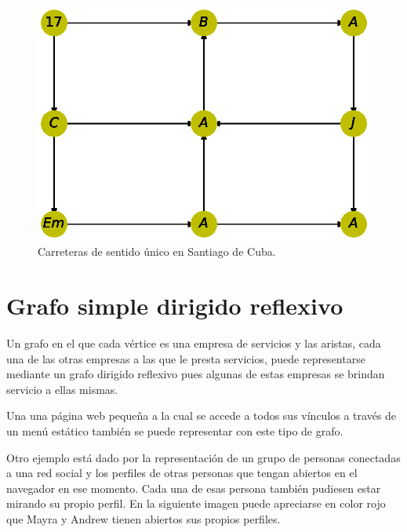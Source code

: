 \documentclass{article}
\begin{document}

\begin{figure}
  \includegraphics[width=.8\columnwidth]{5.eps}
  \caption{Carreteras de sentido único en Santiago de Cuba.}
  \label{fig:5}
\end{figure}


\section{Grafo simple dirigido reflexivo}

Un grafo en el que cada vértice es una empresa de servicios y las aristas, cada una de las otras empresas a las que le presta servicios, puede representarse mediante un grafo dirigido reflexivo pues algunas de estas empresas se brindan servicio a ellas mismas. 

Una una página web pequeña a la cual se accede a todos sus vínculos a través de un menú estático también se puede representar con este tipo de grafo. 

Otro ejemplo está dado por la representación de un grupo de personas conectadas a una red social y los perfiles de otras personas que tengan abiertos en el navegador en ese momento. Cada una de esas persona también pudiesen estar mirando su propio perfil. En la siguiente imagen puede apreciarse en color rojo que Mayra y Andrew tienen abiertos sus propios perfiles.
\end{document}
